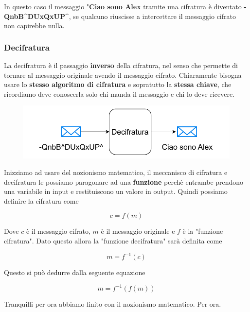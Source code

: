 \documentclass{report}
\begin{document}
In questo caso il messaggio "\textbf{Ciao sono Alex} tramite una cifratura è diventato \textbf{-QnbB\^{}DUxQxUP\^{}}, se qualcuno riuscisse a intercettare il messaggio cifrato non capirebbe nulla.


\subsubsection{Decifratura} La decifratura è il passaggio \textbf{inverso} della cifratura, nel senso che permette di tornare al messaggio originale avendo il messaggio cifrato. Chiaramente bisogna usare lo \textbf{stesso algoritmo di cifratura} e sopratutto la \textbf{stessa chiave}, che ricordiamo deve conoscerla solo chi manda il messaggio e chi lo deve ricevere.


\begin{figure}[h]
     \centering
    \includegraphics[width=0.8\linewidth]{logos/cripto3.pdf}
\end{figure}


Inizziamo ad usare del nozionismo matematico, il meccanisco di cifratura e decifratura le possiamo paragonare ad una \textbf{funzione} perchè entrambe prendono una variabile in input e restituiscono un valore in output. Quindi possiamo definire la cifratura come 

\begin{equation*}
    c = f(m)
\end{equation*}

Dove $c$ è il messaggio cifrato, $m$ è il messaggio originale e $f$ è la "funzione cifratura". Dato questo allora la "funzione decifratura" sarà definita come

\begin{equation*}
    m = f^{-1}(c)
\end{equation*}

Questo si può dedurre dalla seguente equazione

\begin{equation*}
    m = f^{-1}(f(m)) 
\end{equation*}

Tranquilli per ora abbiamo finito con il nozionismo matematico. Per ora.
\end{document}
